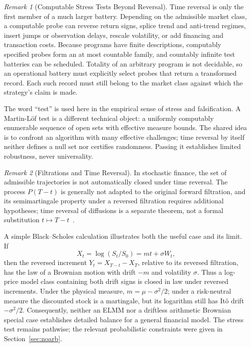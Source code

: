 \documentclass[aps,pra,reprint,superscriptaddress,amsmath,amssymb,floatfix]{revtex4-2}
\theoremstyle{plain}
\theoremstyle{definition}
\theoremstyle{remark}
\newtheorem{remark}{Remark}
\begin{document}
\begin{remark}[Computable Stress Tests Beyond Reversal]
\label{rem:stressfamily}
Time reversal is only the first member of a much larger battery. Depending on
the admissible market class, a computable probe can reverse return signs,
splice trend and anti-trend regimes, insert jumps or observation delays,
rescale volatility, or add financing and transaction costs. Because programs
have finite descriptions, computably specified probes form an at most
countable family, and countably infinite test batteries can be scheduled.
Totality of an arbitrary program is not decidable, so an operational battery
must explicitly select probes that return a transformed record. Each such
record must still belong to the market class against which the strategy's
claim is made.

The word ``test'' is used here in the empirical sense of stress and
falsification. A Martin-L\"of test is a different technical object: a uniformly
computably enumerable sequence of open sets with effective measure bounds.
The shared idea is to confront an algorithm with many effective challenges;
time reversal by itself neither defines a null set nor certifies randomness.
Passing it establishes limited robustness, never universality.
\end{remark}

\begin{remark}[Filtrations and Time Reversal]
In stochastic finance, the set of admissible trajectories is not automatically
closed under time reversal. The process \(P(T-t)\) is generally not adapted to
the original forward filtration, and its semimartingale property under a
reversed filtration requires additional hypotheses; time reversal of
diffusions is a separate theorem, not a formal substitution
\(t\mapsto T-t\)~\cite{HaussmannPardoux1986}.

A simple Black--Scholes calculation illustrates both the useful case and its
limit. If
\[
  X_t=\log(S_t/S_0)=mt+\sigma W_t,
\]
then the reversed increment \(Y_t=X_{T-t}-X_T\), relative to its reversed
filtration, has the law of a Brownian motion with drift \(-m\) and volatility
\(\sigma\). Thus a log-price model class containing both drift signs is closed
in law under reversed increments. Under the physical measure,
\(m=\mu-\sigma^2/2\); under a risk-neutral measure the discounted stock is a
martingale, but its logarithm still has It\^o drift \(-\sigma^2/2\).
Consequently, neither an ELMM nor a driftless arithmetic Brownian special case
establishes detailed balance for a general financial model. The stress test
remains pathwise; the relevant probabilistic constraints were given in
Section~\ref{sec:noarb}.
\end{remark}
\end{document}
